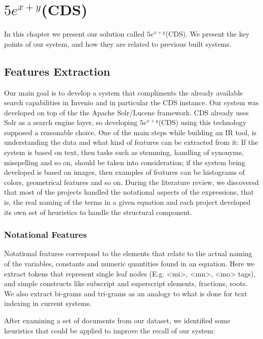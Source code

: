 \chapter{$5e^{x+y}$(CDS)}
\label{chapter-cern_math_explorer}
In this chapter we present our solution called $5e^{x+y}$(CDS). We present the key points of our system, and how they are related to previous built systems.

\section{Features Extraction}
Our main goal is to develop a system that compliments the already available search capabilities in Invenio and in particular the CDS instance. Our system was developed on top of the  the Apache Solr/Lucene framework. CDS already uses Solr as a search engine layer, so developing $5e^{x+y}$(CDS) using this technology supposed a reasonable choice. One of the main steps while building an IR tool, is understanding the data and what kind of features can be extracted from it: If the system is based on text, then tasks such as stemming, handling of synonyms, misspelling and so on, should be taken into consideration; if the system being developed is based on images, then examples of features can be histograms of colors, geometrical features and so on. During the literature review, we discovered that most of the projects handled the notational aspects of the expressions, that is, the real naming of the terms in a given equation and each project developed its own set of heuristics to handle the structural component. 


\subsection{Notational Features}
Notational features correspond to the elements that relate to the actual naming of the variables, constants and numeric quantities found in an equation. Here we extract tokens that represent single leaf nodes (E.g. <mi>, <mn>, <mo> tags), and simple constructs like subscript and superscript elements, fractions, roots.
We also extract bi-grams and tri-grams as an analogy to what is done for text indexing in current systems.

After examining a set of documents from our dataset, we identified some heuristics that could be applied to improve the recall of our system:

